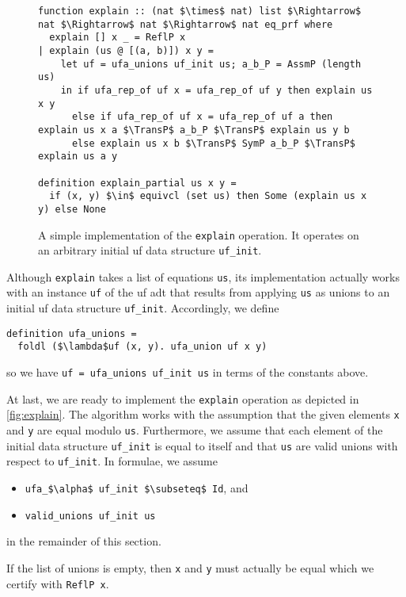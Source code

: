 \documentclass[
  sigplan,
  10pt,
  anonymous,
  review,
  ]{acmart}
\newcommand{\TransP}{\bigtriangledown}
\begin{document}
\begin{figure*}
  \centering
  \begin{lstlisting}
function explain :: (nat $\times$ nat) list $\Rightarrow$ nat $\Rightarrow$ nat $\Rightarrow$ nat eq_prf where
  explain [] x _ = ReflP x
| explain (us @ [(a, b)]) x y =
    let uf = ufa_unions uf_init us; a_b_P = AssmP (length us)
    in if ufa_rep_of uf x = ufa_rep_of uf y then explain us x y
      else if ufa_rep_of uf x = ufa_rep_of uf a then explain us x a $\TransP$ a_b_P $\TransP$ explain us y b
      else explain us x b $\TransP$ SymP a_b_P $\TransP$ explain us a y

definition explain_partial us x y =
  if (x, y) $\in$ equivcl (set us) then Some (explain us x y) else None
  \end{lstlisting}
  \caption{A simple implementation of the \lstinline|explain| operation. It operates on an arbitrary initial \acrshort{uf} data structure \lstinline|uf_init|.\label{fig:explain}}
\end{figure*}
Although \lstinline|explain| takes a list of equations \lstinline|us|, its implementation actually works with an instance \lstinline|uf| of the \acrshort{uf} \acrshort{adt} that results from applying \lstinline|us| as unions to an initial \acrshort{uf} data structure \lstinline|uf_init|.
Accordingly, we define
\begin{lstlisting}
definition ufa_unions =
  foldl ($\lambda$uf (x, y). ufa_union uf x y)
\end{lstlisting}
so we have \lstinline|uf = ufa_unions uf_init us| in terms of the constants above.

At last, we are ready to implement the \lstinline|explain| operation as depicted in \autoref{fig:explain}.
The algorithm works with the assumption that the given elements \lstinline|x| and \lstinline|y| are equal modulo \lstinline|us|.
Furthermore, we assume that each element of the initial data structure \lstinline|uf_init| is equal to itself
and that \lstinline|us| are valid unions with respect to \lstinline|uf_init|.
In formulae, we assume
\begin{itemize}
  \item \lstinline|ufa_$\alpha$ uf_init $\subseteq$ Id|, and
  \item \lstinline|valid_unions uf_init us|
\end{itemize}
in the remainder of this section.

If the list of unions is empty, then \lstinline|x| and \lstinline|y| must actually be equal which we certify with \lstinline|ReflP x|.
\end{document}
